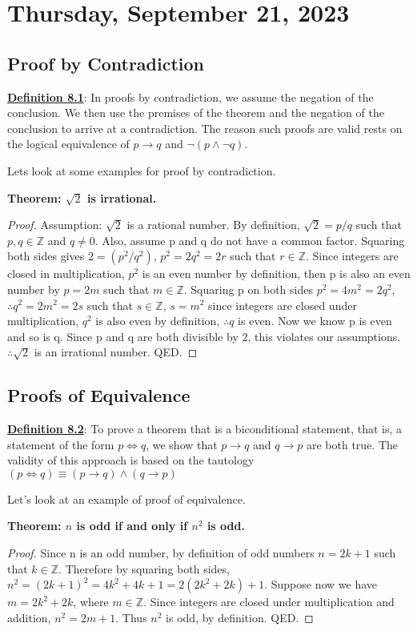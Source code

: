 \section{Thursday, September 21, 2023}
\subsection{Proof by Contradiction}

\textbf{\underline{Definition 8.1}}: In proofs by contradiction, we assume the negation of the conclusion. We then use the premises of the theorem and the negation of the conclusion to arrive at a contradiction. The reason such proofs are valid rests on the logical equivalence of $p \rightarrow q$ and $\neg(p\land \neg q)$.

Lets look at some examples for proof by contradiction.

\begin{example}
    \textbf{Theorem: $\sqrt{2}$ is irrational.}
\end{example}

\begin{proof}
Assumption: $\sqrt{2}$ is a rational number. By definition, $\sqrt{2}=p/q$ such that $p,q \in \mathbb{Z}$ and $q \neq 0$. Also, assume p and q do not have a common factor. Squaring both sides gives $2= (p^2/q^2)$, $p^2=2q^2=2r$ such that $r\in \mathbb{Z}$. Since integers are closed in multiplication, $p^2$ is an even number by definition, then p is also an even number by $p=2m$ such that $m\in \mathbb{Z}$. Squaring p on both sides $p^2=4m^2=2q^2$, $\therefore q^2=2m^2=2s$ such that $s\in \mathbb{Z}$, $s=m^2$ since integers are closed under multiplication, $q^2$ is also even by definition, $\therefore q$ is even. Now we know p is even and so is q. Since p and q are both divisible by 2, this violates our assumptions. $\therefore \sqrt{2}$ is an irrational number. QED.
\end{proof}

\subsection{Proofs of Equivalence}

\textbf{\underline{Definition 8.2}}: To prove a theorem that is a biconditional statement, that is, a statement of the form $p\iff q$, we show that $p \rightarrow q$ and $q \rightarrow p$ are both true. The validity of this approach is based on the tautology $(p \iff q) \equiv (p \rightarrow q) \land (q \rightarrow p)$

Let's look at an example of proof of equivalence.

\begin{example}
    \textbf{Theorem: \(n\) is odd if and only if $n^2$ is odd.}
\end{example}

\begin{proof}
Since n is an odd number, by definition of odd numbers $n=2k+1$ such that $k \in \mathbb{Z}$. Therefore by squaring both sides, $n^2=(2k+1)^2=4k^2+4k+1=2(2k^2+2k)+1$. Suppose now we have $m=2k^2+2k$, where $m \in \mathbb{Z}$. Since integers are closed under multiplication and addition, $n^2=2m+1$. Thus $n^2$ is odd, by definition. QED.
\end{proof}
